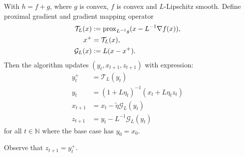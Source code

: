 \documentclass[12pt]{article}
\begin{document}
            \begin{definition}
            \label{def:ag_prox_grad_tri_pt}
                With $h = f + g$, where $g$ is convex, $f$ is convex and $L$-Lipschitz smooth. 
                Define proximal gradient and gradient mapping operator 
                $$
                \begin{aligned}
                    \mathcal T_L(x) 
                    &:= \operatorname{prox}_{L^{-1}g}(x - L^{-1}\nabla f(x)), 
                    \\
                    x^+ &= \mathcal T_L(x), 
                    \\
                    \mathcal G_L(x) 
                    &:= L(x -  x^+). 
                \end{aligned}
                $$
                Then the algorithm updates $(y_t, x_{t + 1}, z_{t + 1})$ with expression: 
                $$
                \begin{aligned}
                    y_t^+ &= \mathcal T_L(y_t)
                    \\
                    y_t &= (1 + L\eta_t)^{-1}(x_t + L\eta_t z_t)
                    \\
                    x_{t + 1} &= x_t - \tilde \eta \mathcal G_L(y_t)
                    \\
                    z_{t + 1} &= y_t - L^{-1}\mathcal G_L(y_t)
                \end{aligned}
                $$
                for all $t\in \mathbb N$ where the base case has $y_0 = x_0$. 
            \end{definition}
            \begin{remark}
                Observe that $z_{t + 1} = y_t^+$. 
            \end{remark}
\end{document}
